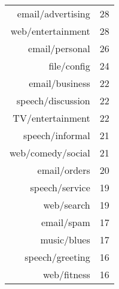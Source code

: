 \begin{table}[ht]
\begin{tabular}{r r}
      email/advertising &  28 \\ 
      web/entertainment &  28 \\ 
      email/personal &  26 \\ 
      file/config &  24 \\ 
      email/business &  22 \\ 
      speech/discussion &  22 \\ 
      TV/entertainment &  22 \\ 
      speech/informal &  21 \\ 
      web/comedy/social &  21 \\ 
      email/orders &  20 \\ 
      speech/service &  19 \\ 
      web/search &  19 \\ 
      email/spam &  17 \\ 
      music/blues &  17 \\ 
      speech/greeting &  16 \\ 
      web/fitness &  16 \\ 

\end{tabular}
\end{table}
